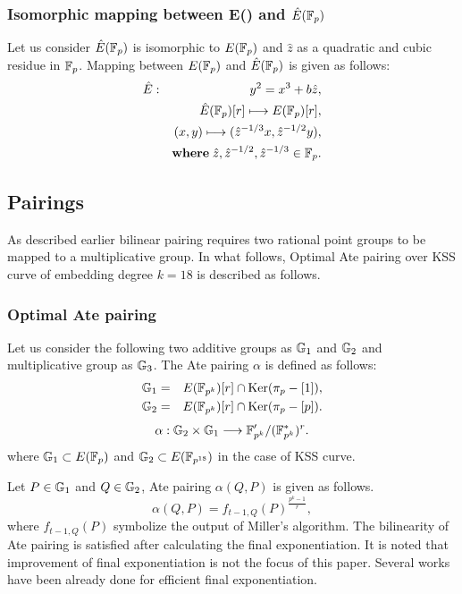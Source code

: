 \subsubsection{Isomorphic mapping  between \texorpdfstring{E(\Fp) and $\hat{E}({\mathbb{F}}_{p})$}{E(Fp) and E'(Fp)}}
Let us consider $\hat{E}({\mathbb{F}}_{p})$  is isomorphic to $E({\mathbb{F}}_{p})$ and $\hat{z}$ as a quadratic and cubic residue in ${\mathbb{F}}_{p}$. Mapping between $E({\mathbb{F}}_{p})$ and $\hat{E}({\mathbb{F}}_{p})$ is given as follows:
\begin{eqnarray}
	\hat{E}&:&y^2=x^3+b\hat{z},\nonumber\\
	&&\hat{E}({\mathbb{F}}_{p})[r]\longmapsto E({\mathbb{F}}_{p})[r],\nonumber\\
	&&(x,y)\longmapsto (\hat{z}^{-1/3}x,\hat{z}^{-1/2}y),\nonumber\\
	&&{\bf where} \;\hat{z}, \hat{z}^{-1/2},\hat{z}^{-1/3}\in {\mathbb{F}}_{p}\label{map2}.
\end{eqnarray}
\subsection{Pairings}
As described earlier bilinear pairing requires two rational point groups to be mapped to a multiplicative group. In what follows,  Optimal Ate pairing over KSS curve of embedding degree $k = 18$ is described as follows.
\subsubsection{Optimal Ate pairing}
Let us consider the following two additive groups as ${\mathbb{G}}_{1}$ and ${\mathbb{G}}_{2}$ and multiplicative group as ${\mathbb{G}}_{3}$. The Ate pairing $\alpha$ is defined as follows:
\begin{eqnarray}
	{\mathbb{G}}_{1}&=&E(\mathbb{F}_{p^k})[r]\cap {\rm Ker}(\pi_p-[1])\nonumber,\\
	{\mathbb{G}}_{2}&=&E(\mathbb{F}_{p^k})[r]\cap {\rm Ker}(\pi_p-[p])\nonumber.
\end{eqnarray}
\begin{eqnarray}
	\alpha:{\mathbb{G}}_{2}\times{\mathbb{G}}_{1}\longrightarrow\mathbb{F}_{p^k}'/(\mathbb{F}_{p^k}^*)^r.
\end{eqnarray}
where ${\mathbb{G}}_{1} \subset E(\mathbb{F}_p)$ and ${\mathbb{G}}_{2} \subset E(\mathbb{F}_{p^{18}})$  in the case of KSS curve.

Let $P \in {\mathbb{G}}_{1}$ and $Q\in{\mathbb{G}}_{2}$, Ate pairing $\alpha(Q,P)$ is given as follows.
\begin{equation}
	\alpha(Q,P)=f_{t-1,Q}(P)^{\frac{p^k-1}{r}},
\end{equation}
where $f_{t-1,Q}(P)$ symbolize the output of Miller's algorithm. The bilinearity of Ate pairing is satisfied after calculating the final exponentiation. It is noted that improvement of final exponentiation is not the focus of this paper. Several works \cite{shirase_final, scott_final} have been already done for efficient final exponentiation.

